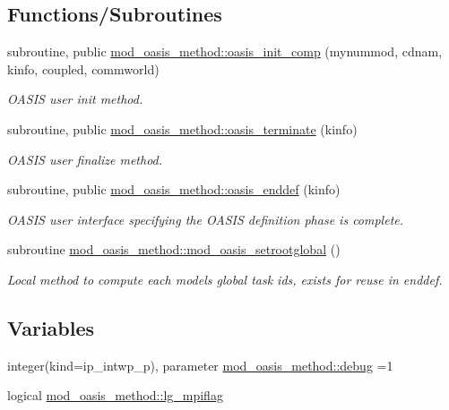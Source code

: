 \subsection*{Functions/\+Subroutines}
\begin{DoxyCompactItemize}
\item 
subroutine, public \hyperlink{namespacemod__oasis__method_ad266b77f6e75f2d150c80374a841a43c}{mod\+\_\+oasis\+\_\+method\+::oasis\+\_\+init\+\_\+comp} (mynummod, cdnam, kinfo, coupled, commworld)
\begin{DoxyCompactList}\small\item\em O\+A\+S\+IS user init method. \end{DoxyCompactList}\item 
subroutine, public \hyperlink{namespacemod__oasis__method_a4fb881336906c9452b6a9f250af9c3d7}{mod\+\_\+oasis\+\_\+method\+::oasis\+\_\+terminate} (kinfo)
\begin{DoxyCompactList}\small\item\em O\+A\+S\+IS user finalize method. \end{DoxyCompactList}\item 
subroutine, public \hyperlink{namespacemod__oasis__method_a093552f9f9895ac79a5fefa043fc5881}{mod\+\_\+oasis\+\_\+method\+::oasis\+\_\+enddef} (kinfo)
\begin{DoxyCompactList}\small\item\em O\+A\+S\+IS user interface specifying the O\+A\+S\+IS definition phase is complete. \end{DoxyCompactList}\item 
subroutine \hyperlink{namespacemod__oasis__method_a13d6e469ea14642a2e1e6cb807d9b7de}{mod\+\_\+oasis\+\_\+method\+::mod\+\_\+oasis\+\_\+setrootglobal} ()
\begin{DoxyCompactList}\small\item\em Local method to compute each models\textquotesingle{} global task ids, exists for reuse in enddef. \end{DoxyCompactList}\end{DoxyCompactItemize}
\subsection*{Variables}
\begin{DoxyCompactItemize}
\item 
integer(kind=ip\+\_\+intwp\+\_\+p), parameter \hyperlink{namespacemod__oasis__method_a390290b92b6af57b2732cb7521532f1c}{mod\+\_\+oasis\+\_\+method\+::debug} =1
\item 
logical \hyperlink{namespacemod__oasis__method_a405af91a0535e4ce70d55513bb4c3867}{mod\+\_\+oasis\+\_\+method\+::lg\+\_\+mpiflag}
\end{DoxyCompactItemize}
